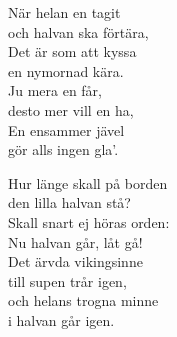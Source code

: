 \documentclass[a6paper,10pt]{article}
\begin{document}
\setlength{\oddsidemargin}{-0.47in}
\noindent
\begin{center}
\end{center}
\begin{lyrics}
När helan en tagit \\
och halvan ska förtära, \\
Det är som att kyssa \\
en nymornad kära. 
\vspace{5pt} \\
Ju mera en får, \\
desto mer vill en ha, \\
En ensammer jävel \\
gör alls ingen gla'. 
\end{lyrics}
\vspace{60pt}
\begin{center}
\end{center}
\begin{lyrics}
Hur länge skall på borden\\ 
den lilla halvan stå? \\
Skall snart ej höras orden: \\
Nu halvan går, låt gå!
\vspace{5pt} \\
Det ärvda vikingsinne \\
till supen trår igen, \\
och helans trogna minne \\
i halvan går igen.
\end{lyrics}
\end{document}
